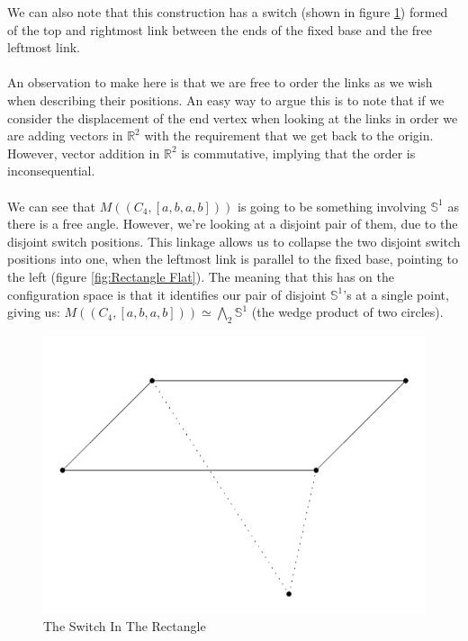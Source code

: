 \documentclass{article}
\begin{document}
\noindent We can also note that this construction has a switch (shown in figure \ref{fig:The Rectangle Switch}) formed of the top and rightmost link between the ends of the fixed base and the free leftmost link. \\\\ An observation to make here is that we are free to order the links as we wish when describing their positions. An easy way to argue this is to note that if we consider the displacement of the end vertex when looking at the links in order we are adding vectors in $\mathbb R^2$ with the requirement that we get back to the origin. However, vector addition in $\mathbb R^2$ is commutative, implying that the order is inconsequential. \noindent \\\\ We can see that $M((C_4,[a,b,a,b]))$ is going to be something involving $\mathbb S^1$ as there is a free angle. However, we're looking at a disjoint pair of them, due to the disjoint switch positions. This linkage allows us to collapse the two disjoint switch positions into one, when the leftmost link is parallel to the fixed base, pointing to the left (figure \ref{fig:Rectangle Flat}). The meaning that this has on the configuration space is that it identifies our pair of disjoint $\mathbb S^1$'s at a single point, giving us: $M((C_4,[a,b,a,b])) \simeq \bigwedge_2 \mathbb S^1$ (the wedge product of two circles).

\begin{figure}[h!]
\centering
\includegraphics[scale=0.4]{./images/rectangle_skewed_alt_switch.png}
\caption{The Switch In The Rectangle}
\label{fig:The Rectangle Switch}
\end{figure}
\end{document}
